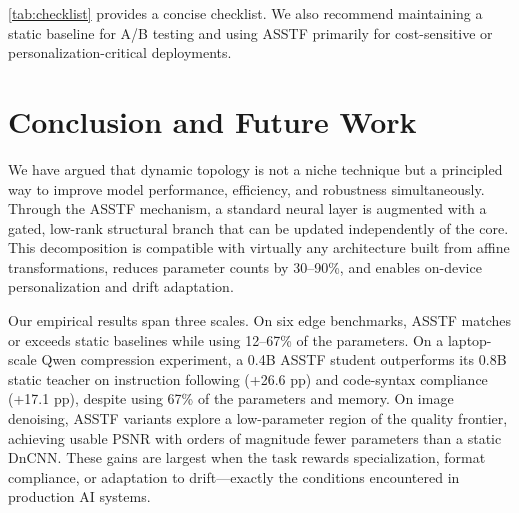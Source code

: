 \documentclass[11pt,a4paper]{article}
\theoremstyle{definition}
\begin{document}
\cref{tab:checklist} provides a concise checklist. We also recommend maintaining a static baseline for A/B testing and using ASSTF primarily for cost-sensitive or personalization-critical deployments.


\section{Conclusion and Future Work}
\label{sec:conclusion}

We have argued that dynamic topology is not a niche technique but a principled way to improve model performance, efficiency, and robustness simultaneously. Through the ASSTF mechanism, a standard neural layer is augmented with a gated, low-rank structural branch that can be updated independently of the core. This decomposition is compatible with virtually any architecture built from affine transformations, reduces parameter counts by 30--90\%, and enables on-device personalization and drift adaptation.

Our empirical results span three scales. On six edge benchmarks, ASSTF matches or exceeds static baselines while using 12--67\% of the parameters. On a laptop-scale Qwen compression experiment, a 0.4B ASSTF student outperforms its 0.8B static teacher on instruction following (+26.6 pp) and code-syntax compliance (+17.1 pp), despite using 67\% of the parameters and memory. On image denoising, ASSTF variants explore a low-parameter region of the quality frontier, achieving usable PSNR with orders of magnitude fewer parameters than a static DnCNN. These gains are largest when the task rewards specialization, format compliance, or adaptation to drift---exactly the conditions encountered in production AI systems.
\end{document}
